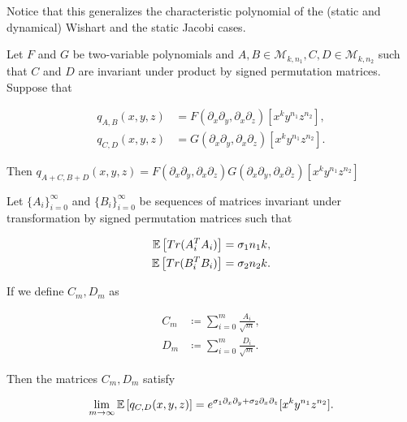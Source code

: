     Notice that this generalizes the characteristic polynomial of the (static and dynamical) Wishart and the static Jacobi cases. 

    \begin{theorem} \label{thm:mult_operators}
        Let $F$ and $G$ be two-variable polynomials and $A,B \in \mathcal M_{k,n_1}, C,D \in \mathcal M_{k,n_2}$ such that $C$ and $D$ are invariant under product by signed permutation matrices. Suppose that

         \begin{align*}
            q_{A,B}(x,y,z) &= F(\partial_x \partial_y,\partial_x\partial_z)[x^ky^{n_1}z^{n_2}],\\ 
            q_{C,D}(x,y,z) &= G(\partial_x \partial_y,\partial_x\partial_z)[x^ky^{n_1}z^{n_2}].
         \end{align*}

         Then $q_{A+C, B+D}(x,y,z) = F(\partial_x \partial_y,\partial_x\partial_z)G(\partial_x \partial_y,\partial_x\partial_z)[x^ky^{n_1}z^{n_2}]$
    \end{theorem}

    \begin{theorem} \label{thm:exp_operator}
        Let $\{A_i\}_{i=0}^\infty$ and $\{B_i\}_{i=0}^\infty$ be sequences of matrices invariant under transformation by signed permutation matrices such that

        \begin{align*}
            \mathbb E \left[ Tr(A^T_iA_i) \right] &= \sigma_1 n_1 k,\\
            \mathbb E \left[ Tr(B^T_iB_i) \right] &= \sigma_2 n_2 k.
        \end{align*}

        If we define $C_m, D_m$ as

        \begin{align*}
            C_m &\coloneqq \sum_{i=0}^m \frac{A_i}{\sqrt m}, \\
            D_m &\coloneqq \sum_{i=0}^m \frac{D_i}{\sqrt m}.
        \end{align*}

        Then the matrices $C_m, D_m$ satisfy

        \begin{equation*}
            \lim_{m\to\infty} \mathbb E \left[ q_{C,D}(x,y,z) \right] = e^{\sigma_1 \partial_x \partial_y + \sigma_2 \partial_x \partial_z}[x^k y^{n_1} z^{n_2}].
        \end{equation*}
    \end{theorem}

